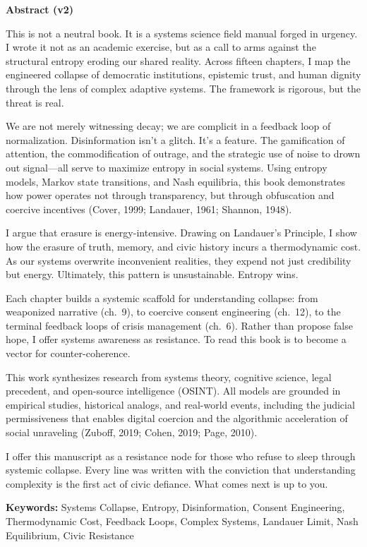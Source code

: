 \documentclass[
]{article}
\author{}
\date{}
\begin{document}
\textbf{Abstract (v2)}

This is not a neutral book. It is a systems science field manual forged in urgency. I wrote it not as an academic exercise, but as a call to arms against the structural entropy eroding our shared reality. Across fifteen chapters, I map the engineered collapse of democratic institutions, epistemic trust, and human dignity through the lens of complex adaptive systems. The framework is rigorous, but the threat is real.

We are not merely witnessing decay; we are complicit in a feedback loop of normalization. Disinformation isn't a glitch. It's a feature. The gamification of attention, the commodification of outrage, and the strategic use of noise to drown out signal---all serve to maximize entropy in social systems. Using entropy models, Markov state transitions, and Nash equilibria, this book demonstrates how power operates not through transparency, but through obfuscation and coercive incentives (Cover, 1999; Landauer, 1961; Shannon, 1948).

I argue that erasure is energy-intensive. Drawing on Landauer's Principle, I show how the erasure of truth, memory, and civic history incurs a thermodynamic cost. As our systems overwrite inconvenient realities, they expend not just credibility but energy. Ultimately, this pattern is unsustainable. Entropy wins.

Each chapter builds a systemic scaffold for understanding collapse: from weaponized narrative (ch.~9), to coercive consent engineering (ch.~12), to the terminal feedback loops of crisis management (ch.~6). Rather than propose false hope, I offer systems awareness as resistance. To read this book is to become a vector for counter-coherence.

This work synthesizes research from systems theory, cognitive science, legal precedent, and open-source intelligence (OSINT). All models are grounded in empirical studies, historical analogs, and real-world events, including the judicial permissiveness that enables digital coercion and the algorithmic acceleration of social unraveling (Zuboff, 2019; Cohen, 2019; Page, 2010).

I offer this manuscript as a resistance node for those who refuse to sleep through systemic collapse. Every line was written with the conviction that understanding complexity is the first act of civic defiance. What comes next is up to you.

\textbf{Keywords:} Systems Collapse, Entropy, Disinformation, Consent Engineering, Thermodynamic Cost, Feedback Loops, Complex Systems, Landauer Limit, Nash Equilibrium, Civic Resistance
\end{document}
